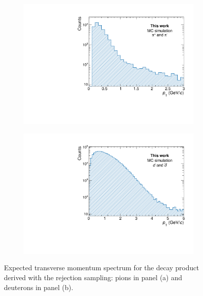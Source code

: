 \begin{figure}[htb]
\begin{subfigure}{.5\textwidth}
  \centering
  \captionsetup{justification=centering}
  \includegraphics[width=\linewidth]{gfx/pi_spectrum}
  \caption{}
  \label{fig:pi_spectrum}
\end{subfigure}%
\begin{subfigure}{.5\textwidth}
  \centering
  \captionsetup{justification=centering}
  \includegraphics[width=\linewidth]{gfx/deu_spectrum}
  \caption{}
  \label{fig:deu_spectrum}
\end{subfigure}
\caption{Expected transverse momentum spectrum for the \ds decay product derived with the rejection sampling: pions in panel (a) and deuterons in panel (b).}
\label{fig:BW_spec_prod}
\end{figure}

